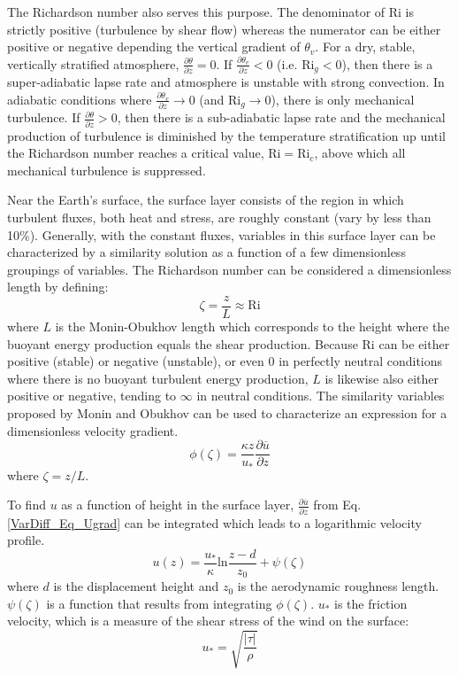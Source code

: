 The Richardson number also serves this purpose.
The denominator of $\mathrm{Ri}$ is strictly positive (turbulence by shear flow) whereas the numerator can be either
positive or negative depending the vertical gradient of $\theta_v$. For a dry, stable, vertically
stratified atmosphere, $\frac{\partial \theta}{\partial z}=0$.
If $\frac{\partial \theta_v}{\partial z}<0$ (i.e. $\mathrm{Ri}_g<0$), then there is a super-adiabatic lapse rate
and atmosphere is unstable with strong convection. In adiabatic conditions where
$\frac{\partial \theta_v}{\partial z} \rightarrow 0$ (and $\mathrm{Ri}_g \rightarrow 0$),
there is only mechanical turbulence. If $\frac{\partial \theta}{\partial z}>0$, then there
is a sub-adiabatic lapse rate and the mechanical production of turbulence is diminished by
the temperature stratification up until the Richardson number reaches a critical value,
$\mathrm{Ri} = \mathrm{Ri}_c$, above which all mechanical turbulence is suppressed.

Near the Earth's surface, the surface layer consists of the region in which turbulent fluxes,
both heat and stress, are roughly constant (vary by less than 10\%). Generally, with the constant
fluxes, variables in this surface layer can be characterized by a similarity solution as a function
of a few dimensionless groupings of variables. The Richardson number can be considered a dimensionless
length by defining:
\begin{equation}\label{VarDiff_Eq_ScaleHeight}
\zeta = \frac{z}{L} \approx \mathrm{Ri}
\end{equation}
where $L$ is the Monin-Obukhov length which corresponds to the height where the buoyant energy production
equals the shear production. Because $\mathrm{Ri}$ can be either positive (stable) or negative (unstable), or
even 0 in perfectly neutral conditions where there is no buoyant turbulent energy production, $L$ is likewise
also either positive or negative, tending to $\infty$ in neutral conditions. 
The similarity variables proposed by Monin and Obukhov can be used to characterize an expression for 
a dimensionless velocity gradient.
\begin{equation}\label{VarDiff_Eq_Ugrad}
\phi(\zeta) = \frac{\kappa z}{u_*} \frac{\partial \overline{u}}{\partial z}  %
\end{equation}
where $\zeta = z/L$.

To find $u$ as a function of height in the surface layer, $\frac{\partial \overline{u}}{\partial z}$
from Eq. \ref{VarDiff_Eq_Ugrad} can be integrated
which leads to a logarithmic velocity profile.
\begin{equation}\label{VarDiff_Eq_Ulog}
u(z) = \frac{u_{*}}{\kappa} \mathrm{ln} \frac{z-d}{z_0} + \psi (\zeta)
\end{equation}
where $d$ is the displacement height and $z_0$ is the aerodynamic roughness length. $\psi (\zeta)$ is
a function that results from integrating $\phi(\zeta)$.
$u_{*}$ is the friction velocity, which is a measure of the shear stress of the wind on the surface:
\begin{equation}\label{VarDiff_Eq_Ustar}
u_{*} = \sqrt{\frac{|\tau|}{\rho}}
\end{equation}

